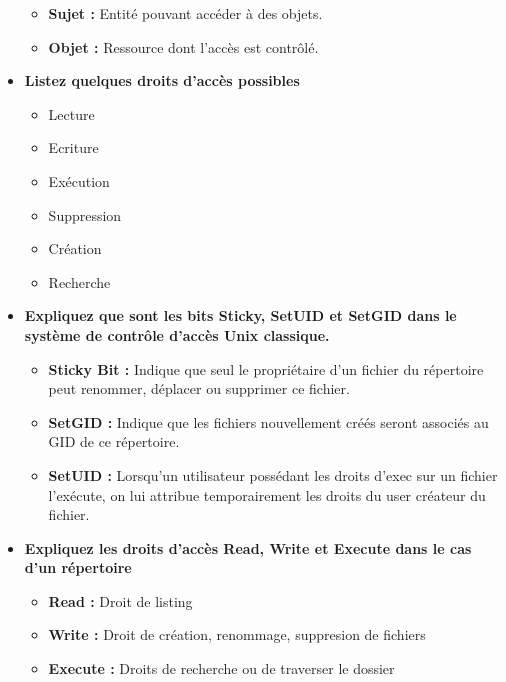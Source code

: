 \documentclass{report}
\begin{document}
\begin{itemize}
					\begin{itemize}
						\item \textbf{Sujet : } Entité pouvant accéder à des objets.
						\item \textbf{Objet : } Ressource dont l'accès est contrôlé.
					\end{itemize}

				\item \textbf{Listez quelques droits d'accès possibles}\\

					\begin{itemize}
						\item Lecture
						\item Ecriture
						\item Exécution
						\item Suppression
						\item Création
						\item Recherche
					\end{itemize}

				\item \textbf{Expliquez que sont les bits Sticky, SetUID et SetGID dans le système de contrôle d'accès Unix classique.}\\

					\begin{itemize}
						\item \textbf{Sticky Bit : } Indique que seul le propriétaire d'un fichier du répertoire peut renommer, déplacer ou supprimer ce fichier.
						\item \textbf{SetGID : } Indique que les fichiers nouvellement créés seront associés au GID de ce répertoire.
						\item \textbf{SetUID : } Lorsqu'un utilisateur possédant les droits d'exec sur un fichier l'exécute, on lui attribue temporairement les droits du user créateur du fichier.\\
					\end{itemize}

				\item \textbf{Expliquez les droits d'accès Read, Write et Execute dans le cas d'un répertoire}\\

					\begin{itemize}
						\item \textbf{Read : } Droit de listing
						\item \textbf{Write : } Droit de création, renommage, suppresion de fichiers
						\item \textbf{Execute : } Droits de recherche ou de traverser le dossier
					\end{itemize}


\end{itemize}
\end{document}
